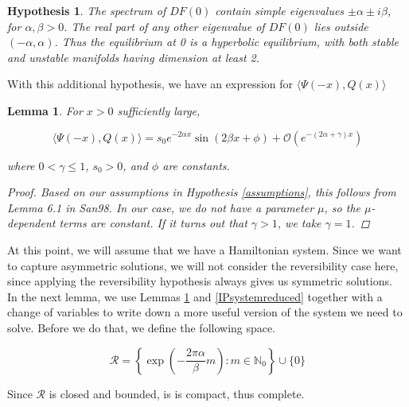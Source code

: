 \documentclass[12pt]{article}
\def\N{{\mathbb N}}
\newtheorem{lemma}{Lemma}
\newtheorem{hypothesis}{Hypothesis}
\begin{document}
\begin{hypothesis}The spectrum of $DF(0)$ contain simple eigenvalues $\pm \alpha \pm i \beta$, for $\alpha, \beta > 0$. The real part of any other eigenvalue of $DF(0)$ lies outside $(-\alpha, \alpha)$. Thus the equilibrium at 0 is a hyperbolic equilibrium, with both stable and unstable manifolds having dimension at least 2.
\end{hypothesis}

With this additional hypothesis, we have an expression for $\langle \Psi(-x), Q(x) \rangle$


\begin{lemma}\label{IPform}
For $x > 0$ sufficiently large,

\begin{equation}\label{IPalphabeta}
\langle \Psi(-x), Q(x) \rangle
= s_0 e^{-2 \alpha x} \sin(2 \beta x + \phi) + \mathcal{O}(e^{-(2 \alpha + \gamma) x})
\end{equation}

where $0 < \gamma \leq 1$, $s_0 > 0$, and $\phi$ are constants.
\begin{proof}
Based on our assumptions in Hypothesis \ref{assumptions}, this follows from Lemma 6.1 in San98. In our case, we do not have a parameter $\mu$, so the $\mu$-dependent terms are constant. If it turns out that $\gamma > 1$, we take $\gamma = 1$.
\end{proof}
\end{lemma}

At this point, we will assume that we have a Hamiltonian system. Since we want to capture asymmetric solutions, we will not consider the reversibility case here, since applying the reversibility hypothesis always gives us symmetric solutions.\\

In the next lemma, we use Lemmas \ref{IPform} and \ref{IPsystemreduced} together with a change of variables to write down a more useful version of the system we need to solve. Before we do that, we define the following space.

\begin{equation}\label{setR}
\mathcal{R} = \left\{ \exp\left(-\frac{2 \pi \alpha}{\beta}m\right) : m \in \N_0 \right\} \cup \{ 0 \}
\end{equation}

Since $\mathcal{R}$ is closed and bounded, is is compact, thus complete.

\end{document}
